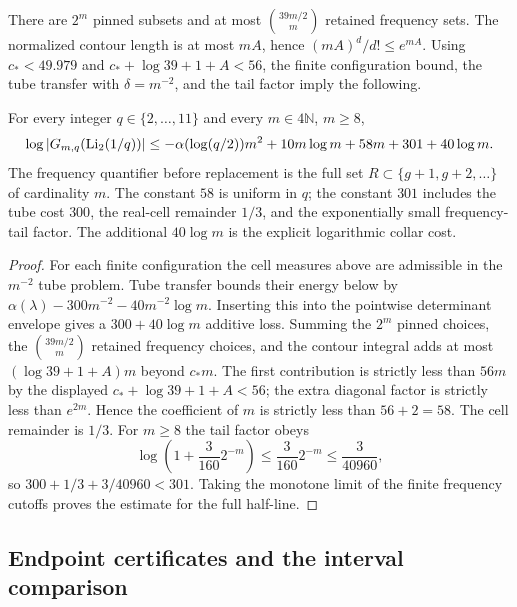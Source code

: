 There are $2^m$ pinned subsets and at most $\binom{39m/2}{m}$ retained
frequency sets.  The normalized contour length is at most $mA$, hence
$(mA)^d/d!\le e^{mA}$.  Using $c_*<49.979$ and
$c_*+\log39+1+A<56$, the finite configuration bound, the tube transfer
with $\delta=m^{-2}$, and the tail factor imply the following.

\begin{lemma}\label{lem:p0-smoothing-transfer}
For every integer $q\in\{2,\ldots,11\}$ and every $m\in4\mathbb N$,
 $m\ge8$,
\begin{equation}\label{eq:p0-q-uniform-det}
 \log|G_{m,q}(\operatorname{Li}_2(1/q))|
 \le-\alpha(\log(q/2))m^2+10m\log m+58m+301+40\log m.
\end{equation}
The frequency quantifier before replacement is the full set
$R\subset\{g+1,g+2,\ldots\}$ of cardinality $m$.  The constant $58$ is
uniform in $q$; the constant $301$ includes the tube cost $300$, the
real-cell remainder $1/3$, and the exponentially small frequency-tail
factor.  The additional $40\log m$ is the explicit logarithmic collar cost.
\end{lemma}

\begin{proof}
For each finite configuration the cell measures above are admissible in the
$m^{-2}$ tube problem.  Tube transfer bounds their energy below by
$\alpha(\lambda)-300m^{-2}-40m^{-2}\log m$.  Inserting this into the pointwise determinant
envelope gives a $300+40\log m$ additive loss.  Summing the $2^m$ pinned choices,
the $\binom{39m/2}{m}$ retained frequency choices, and the contour integral
 adds at most $(\log39+1+A)m$ beyond $c_*m$.  The first contribution is
strictly less than $56m$ by the displayed $c_*+\log39+1+A<56$; the extra
diagonal factor is strictly less than $e^{2m}$.  Hence the coefficient of
$m$ is strictly less than $56+2=58$.  The cell remainder is $1/3$.  For
$m\ge8$ the tail factor obeys
\[
 \log\left(1+\frac3{160}2^{-m}\right)
 \le\frac3{160}2^{-m}\le\frac3{40960},
\]
so $300+1/3+3/40960<301$.  Taking the
monotone limit of the finite frequency cutoffs proves the estimate for the
full half-line.
\end{proof}

\subsection{Endpoint certificates and the interval comparison}

